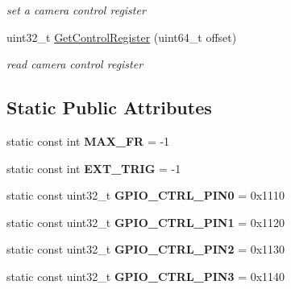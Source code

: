 \begin{DoxyCompactItemize}
\begin{DoxyCompactList}\small\item\em set a camera control register \end{DoxyCompactList}\item 
uint32\+\_\+t \hyperlink{classpangolin_1_1_firewire_video_a98257feba91833cb43eb899a35b7c036}{Get\+Control\+Register} (uint64\+\_\+t offset)\hypertarget{classpangolin_1_1_firewire_video_a98257feba91833cb43eb899a35b7c036}{}\label{classpangolin_1_1_firewire_video_a98257feba91833cb43eb899a35b7c036}

\begin{DoxyCompactList}\small\item\em read camera control register \end{DoxyCompactList}\end{DoxyCompactItemize}
\subsection*{Static Public Attributes}
\begin{DoxyCompactItemize}
\item 
static const int {\bfseries M\+A\+X\+\_\+\+FR} = -\/1\hypertarget{classpangolin_1_1_firewire_video_a0ce79c1df497e71c022fe9919713e5af}{}\label{classpangolin_1_1_firewire_video_a0ce79c1df497e71c022fe9919713e5af}

\item 
static const int {\bfseries E\+X\+T\+\_\+\+T\+R\+IG} = -\/1\hypertarget{classpangolin_1_1_firewire_video_aea2debb6123acf1d1ceefeeb0663f04c}{}\label{classpangolin_1_1_firewire_video_aea2debb6123acf1d1ceefeeb0663f04c}

\item 
static const uint32\+\_\+t {\bfseries G\+P\+I\+O\+\_\+\+C\+T\+R\+L\+\_\+\+P\+I\+N0} = 0x1110\hypertarget{classpangolin_1_1_firewire_video_a2e5e177ea31dd40acfd518c79e53c246}{}\label{classpangolin_1_1_firewire_video_a2e5e177ea31dd40acfd518c79e53c246}

\item 
static const uint32\+\_\+t {\bfseries G\+P\+I\+O\+\_\+\+C\+T\+R\+L\+\_\+\+P\+I\+N1} = 0x1120\hypertarget{classpangolin_1_1_firewire_video_ad2983819408781dcecc1d8be4b3a4f3f}{}\label{classpangolin_1_1_firewire_video_ad2983819408781dcecc1d8be4b3a4f3f}

\item 
static const uint32\+\_\+t {\bfseries G\+P\+I\+O\+\_\+\+C\+T\+R\+L\+\_\+\+P\+I\+N2} = 0x1130\hypertarget{classpangolin_1_1_firewire_video_aeba42568a56d4b049308d2af68d9ea9d}{}\label{classpangolin_1_1_firewire_video_aeba42568a56d4b049308d2af68d9ea9d}

\item 
static const uint32\+\_\+t {\bfseries G\+P\+I\+O\+\_\+\+C\+T\+R\+L\+\_\+\+P\+I\+N3} = 0x1140\hypertarget{classpangolin_1_1_firewire_video_a62d1a598f80a69265f5d84a211410353}{}\label{classpangolin_1_1_firewire_video_a62d1a598f80a69265f5d84a211410353}

\end{DoxyCompactItemize}

